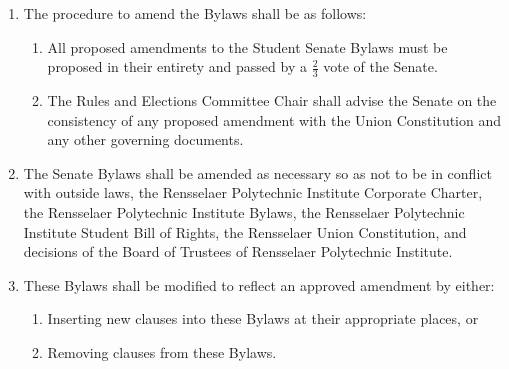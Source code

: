 \begin{enumerate}
\item The procedure to amend the Bylaws shall be as follows:
\begin{enumerate}
\item All proposed amendments to the Student Senate Bylaws must be proposed in their entirety and passed by a $\frac{2}{3}$ vote of the
Senate.
\item The Rules and Elections Committee Chair shall advise the Senate on the consistency of any proposed amendment with the
Union Constitution and any other governing documents.
\end{enumerate}

\item The Senate Bylaws shall be amended as necessary so as not to be in conflict with outside laws, the Rensselaer Polytechnic
Institute Corporate Charter, the Rensselaer Polytechnic Institute Bylaws, the Rensselaer Polytechnic Institute Student Bill of
Rights, the Rensselaer Union Constitution, and decisions of the Board of Trustees of Rensselaer Polytechnic Institute.

\item These Bylaws shall be modified to reflect an approved amendment by either:
\begin{enumerate}
\item Inserting new clauses into these Bylaws at their appropriate places, or
\item Removing clauses from these Bylaws.
\end{enumerate}
\end{enumerate}